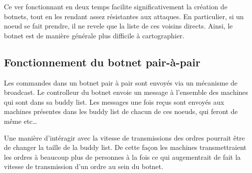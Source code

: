 Ce ver fonctionnant en deux temps facilite significativement la création de
botnets, tout en les rendant assez résistantes aux attaques. En particulier,
si un noeud se fait prendre, il ne revele que la liste de ces voisins directs.
Ainsi, le botnet est de manière générale plus difficile à cartographier.

\subsection{Fonctionnement du botnet pair-à-pair}

Les commandes dans un botnet pair à pair sont envoyés via un mécanisme de broadcast.
Le controlleur du botnet envoie un message à l'ensemble des machines qui sont dans sa buddy list.
Les messages une fois reçus sont envoyés aux machines présentes dans les
buddy list de chacun de ces noeuds, qui feront de même etc\ldots

Une manière d'intéragir avec la vitesse de transmissions des ordres pourrait
être de changer la taille de la buddy list. De cette façon les machines
transmettraient les ordres à beaucoup plus de personnes à la fois ce qui
augementrait de fait la vitesse de transmission d'un ordre au sein du botnet.
